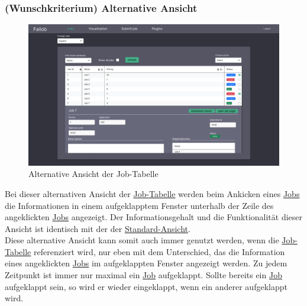 \subsubsection{(Wunschkriterium) Alternative Ansicht}
\begin{figure}[H]
    \label{fig:job-table-exp}
    \includegraphics[width=\textwidth]{images-interface/v5_interface/job_table_expanded_5.pdf}
    \caption{Alternative Ansicht der Job-Tabelle}
\end{figure}
Bei dieser alternativen Ansicht der \hyperref[pages:job-table]{Job-Tabelle} werden beim Ankicken eines \hyperref[B:Jobs]{Jobs} die Informationen in einem aufgeklapptem Fenster unterhalb der Zeile des angeklickten \hyperref[B:Jobs]{Jobs} angezeigt. Der Informationsgehalt und die Funktionalität dieser Ansicht ist identisch mit der der \hyperref[pages:job-table-default]{Standard-Ansicht}. \\
Diese alternative Ansicht kann somit auch immer genutzt werden, wenn die \hyperref[pages:job-table]{Job-Tabelle} referenziert wird, nur eben mit dem Unterschied, das die Information eines angeklickten \hyperref[B:Jobs]{Jobs} im aufgeklappten Fenster angezeigt werden.
Zu jedem Zeitpunkt ist immer nur maximal ein \hyperref[B:Jobs]{Job} aufgeklappt. Sollte bereits ein \hyperref[B:Jobs]{Job} aufgeklappt sein, so wird er wieder eingeklappt, wenn ein anderer aufgeklappt wird.\\



\newpage
